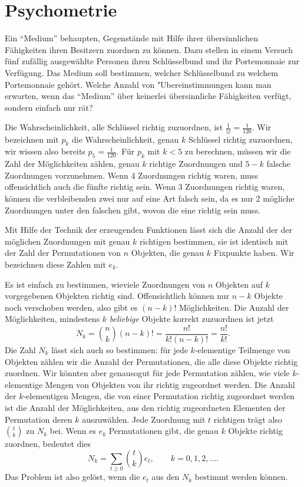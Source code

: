 \section{Psychometrie}
Ein ``Medium'' behaupten, Gegenstände mit Hilfe ihrer übersinnlichen Fähigkeiten
ihren Besitzern zuordnen zu können.
Dazu stellen in einem Versuch fünf
zufällig ausgewählte Personen ihren Schlüsselbund und ihr Portemonnaie zur
Ver\-fügung.
Das Medium soll bestimmen, welcher Schlüsselbund zu welchem
Portemonnaie gehört.
Welche Anzahl von "Ubereinstimmungen kann man erwarten, wenn das ``Medium''
über keinerlei übersinnliche Fähigkeiten verfügt, sondern einfach nur rät?

Die Wahrscheinlichkeit, alle Schlüssel richtig zuzuordnen, ist $\frac1{5!}=\frac1{120}$.
Wir bezeichnen mit $p_k$ die Wahrscheinlichkeit, genau $k$ Schlüssel richtig zuzuordnen,
wir wissen also bereits $p_5=\frac1{120}$.
Für $p_k$ mit $k<5$ zu berechnen, 
müssen wir die Zahl der Möglichkeiten zählen, genau $k$ richtige Zuordnungen
und $5-k$ falsche Zuordnungen vorzunehmen.
Wenn 4 Zuordnungen richtig waren,
muss offensichtlich auch die fünfte richtig sein.
Wenn 3 Zuordnungen richtig waren,
können die verbleibenden zwei nur auf eine Art falsch sein, da es nur 2 mögliche
Zuordnungen unter den falschen gibt, wovon die eine richtig sein muss.

Mit Hilfe der Technik der erzeugenden Funktionen lässt sich die Anzahl der
der möglichen Zuordnungen mit genau $k$ richtigen bestimmen, sie ist identisch
mit der Zahl der Permutationen von $n$ Objekten, die genau $k$ Fixpunkte haben.
Wir bezeichnen diese Zahlen mit $e_k$.

Es ist einfach zu bestimmen, wieviele Zuordnungen von $n$ Objekten auf $k$
vorgegebenen Objekten richtig sind.
Offensichtlich können nur $n-k$ Objekte
noch verschoben werden, also gibt es $(n-k)!$ Möglichkeiten.
Die Anzahl der Möglichkeiten, mindestens $k$ {\it beliebige} Objekte korrekt
zuzuordnen ist jetzt
$$N_k=\binom{n}{k}(n-k)!=\frac{n!}{k!(n-k)!}=\frac{n!}{k!}.$$
Die Zahl $N_k$ lässt sich auch so bestimmen: für jede $k$-elementige
Teilmenge von Objekten zählen wir die Anzahl der Permutationen, die 
alle diese Objekte richtig zuordnen.
Wir könnten aber genausogut
für jede Permutation zählen, wie viele $k$-elementige Mengen von Objekten
von ihr richtig zugeordnet werden.
Die Anzahl der $k$-elementigen Mengen,
die von einer Permutation richtig zugeordnet werden ist die Anzahl der
Möglichkeiten, aus den richtig zugeordneten Elementen der Permutation
deren $k$ auszuwählen.
Jede Zuordnung mit $t$ richtigen trägt also
$\binom{t}{k}$ zu $N_k$ bei.
Wenn es $e_k$ Permutationen gibt,
die genau $k$ Objekte richtig zuordnen, bedeutet dies
$$N_k=\sum_{t\ge 0}\binom{t}{k}e_t,\qquad k=0,1,2,\dots.$$
Das Problem ist also gelöst, wenn die $e_t$ aus den $N_k$ bestimmt werden können.

